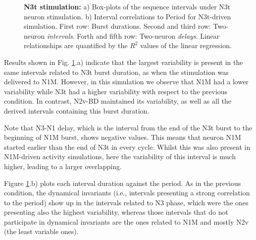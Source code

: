 \begin{figure}[hbt!]
\begin{minipage}[b]{0.53\textwidth}
\begin{minipage}[b]{\textwidth}
		\end{minipage}
	\end{minipage}
	\caption{\textbf{N3t stimulation:} a) Box-plots of the sequence intervals under N3t neuron stimulation. b) Interval correlations to Period for N3t-driven simulation. First row: Burst durations. Second and third row: Two-neuron \textit{intervals}. Forth and fifth row: Two-neuron \textit{delays}. Linear relationships are quantified by the $R^2$ values of the linear regression.}
	\label{fig:invariants n3t}
\end{figure}

Results shown in Fig. \ref{fig:invariants n3t}.a) indicate that the largest variability is present in the same intervals related to N3t burst duration, as when the stimulation was delivered to N1M. However, in this simulation we observe that N1M had a lower variability while N3t had a higher variability with respect to the previous condition. 
In contrast, N2v-BD maintained its variability, as well as all the derived intervals containing this burst duration.

Note that N3-N1 delay, which is the interval from the end of the N3t burst to the beginning of N1M burst, shows negative values. This means that neuron N1M started earlier than the end of N3t in every cycle. Whilst this was also present in N1M-driven activity simulations, here the variability of this interval is much higher, leading to a larger overlapping.

Figure \ref{fig:invariants n3t}.b) plots each interval duration against the period. As in the previous condition, the dynamical invariants (i.e., intervals presenting a strong correlation to the period) show up in the intervals related to N3 phase, which were the ones presenting also the highest variability, whereas those intervals that do not participate in dynamical invariants are the ones related to N1M and mostly N2v (the least variable ones). 








